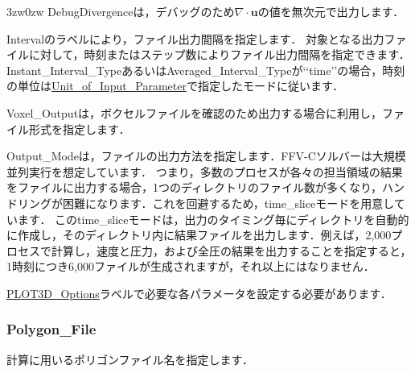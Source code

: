 \begin{indentation}{3zw}{0zw}
DebugDivergenceは，デバッグのため$\nabla \cdot \bm{u}$の値を無次元で出力します．

Intervalのラベルにより，ファイル出力間隔を指定します．
対象となる出力ファイルに対して，時刻またはステップ数によりファイル出力間隔を指定できます．
Instant\_Interval\_TypeあるいはAveraged\_Interval\_Typeが\lq\lq time\rq\rq の場合，時刻の単位は\hyperlink{tgt:unit}{Unit\_of\_Input\_Parameter}で指定したモードに従います．

Voxel\_Outputは，ボクセルファイルを確認のため出力する場合に利用し，ファイル形式を指定します．

Output\_Modeは，ファイルの出力方法を指定します．FFV-Cソルバーは大規模並列実行を想定しています．
つまり，多数のプロセスが各々の担当領域の結果をファイルに出力する場合，1つのディレクトリのファイル数が多くなり，ハンドリングが困難になります．これを回避するため，time\_sliceモードを用意しています．
このtime\_sliceモードは，出力のタイミング毎にディレクトリを自動的に作成し，そのディレクトリ内に結果ファイルを出力します．例えば，2,000プロセスで計算し，速度と圧力，および全圧の結果を出力することを指定すると，1時刻につき6,000ファイルが生成されますが，それ以上にはなりません．

\hyperlink{tgt:plot3d\_options}{PLOT3D\_Options}ラベルで必要な各パラメータを設定する必要があります．

\end{indentation}



\pagebreak
\subsubsection{Polygon\_File}
計算に用いる\hypertarget{tgt:poly_file_name}{ポリゴンファイル名}を指定します．

